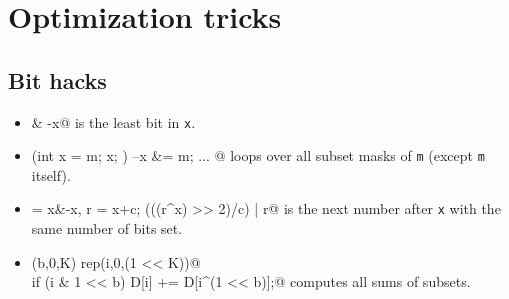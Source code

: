 \section{Optimization tricks}
	\subsection{Bit hacks}
		\begin{itemize}
			\item \verb@x & -x@ is the least bit in \texttt{x}.
			\item \verb@for (int x = m; x; ) { --x &= m; ... }@ loops over all subset masks of \texttt{m} (except \texttt{m} itself).
			\item \verb@c = x&-x, r = x+c; (((r^x) >> 2)/c) | r@ is the next number after \texttt{x} with the same number of bits set.
			\item \verb@rep(b,0,K) rep(i,0,(1 << K))@ \\ \verb@  if (i & 1 << b) D[i] += D[i^(1 << b)];@ computes all sums of subsets.
		\end{itemize}
